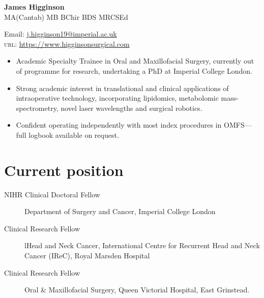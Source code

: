\documentclass[11pt]{article} %
\begin{document}

{\LARGE\bfseries James Higginson} %
\\{\Large MA(Cantab) MB BChir BDS MRCSEd}
\bigskip\bigskip\medskip %




Email: \href{mailto:j.higginson19@imperial.ac.uk}{j.higginson19@imperial.ac.uk}\\ %
\textsc{url}: \href{https://www.higginsonsurgical.com}{https://www.higginsonsurgical.com}\\ %

\vspace{0.06\textheight} %

\begin{itemize}
\item Academic Specialty Trainee in Oral and Maxillofacial Surgery, currently out of programme for research, undertaking a PhD at Imperial College London. 
\item Strong academic interest in translational and clinical applications of intraoperative technology, incorporating lipidomics, metabolomic mass-spectrometry, novel laser wavelengths and surgical robotics. 
\item Confident operating independently with most index procedures in OMFS---full logbook available on request.
\end{itemize}

\section*{Current position}

\begin{description}
\item[NIHR Clinical Doctoral Fellow] Department of Surgery and Cancer, Imperial College London%
\item[Clinical Research Fellow]lHead and Neck Cancer, International Centre for Recurrent Head and Neck Cancer (IReC), Royal Marsden Hospital
\item[Clinical Research Fellow] Oral \& Maxillofacial Surgery, Queen Victorial Hospital, East Grinstead.
\end{description}
\end{document}

